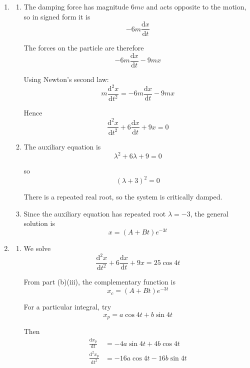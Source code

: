\documentclass[leqno]{article}
\begin{document}
\begin{enumerate}[
  label=\textbf{\arabic*.},
  leftmargin=*,
  topsep=0pt,
  partopsep=0pt,
  parsep=0pt
]
\begin{djsSolution}
\begin{enumerate}[label=\textbf{(\alph*)}]
\begin{enumerate}[label=(\roman*)]
    the amplitude is
    \[
    \sqrt{A^2+B^2}
    \]

    Here \(A=1\) and \(B=-2\), so
    \[
    \text{Amplitude}=\sqrt{1^2+(-2)^2}=\sqrt{5}\,\mathrm{m}
    \]
  \end{enumerate}

  \item
  \begin{enumerate}[label=(\roman*)]
    \item The damping force has magnitude \(6mv\) and acts opposite to the motion, so in signed form it is
    \[
    -6m\frac{\mathrm{d}x}{\mathrm{d}t}
    \]

    The forces on the particle are therefore
    \[
    -6m\frac{\mathrm{d}x}{\mathrm{d}t}-9mx
    \]

    Using Newton's second law:
    \[
    m\frac{\mathrm{d}^2x}{\mathrm{d}t^2}=-6m\frac{\mathrm{d}x}{\mathrm{d}t}-9mx
    \]

    Hence
    \[
    \frac{\mathrm{d}^2x}{\mathrm{d}t^2}+6\frac{\mathrm{d}x}{\mathrm{d}t}+9x=0
    \]

    \item The auxiliary equation is
    \[
    \lambda^2+6\lambda+9=0
    \]

    so
    \[
    (\lambda+3)^2=0
    \]

    There is a repeated real root, so the system is critically damped.

    \item Since the auxiliary equation has repeated root \(\lambda=-3\), the general solution is
    \[
    x=(A+Bt)e^{-3t}
    \]
  \end{enumerate}

  \item
  \begin{enumerate}[label=(\roman*)]
    \item We solve
    \[
    \frac{\mathrm{d}^2x}{\mathrm{d}t^2}+6\frac{\mathrm{d}x}{\mathrm{d}t}+9x=25\cos 4t
    \]

    From part (b)(iii), the complementary function is
    \[
    x_c=(A+Bt)e^{-3t}
    \]

    For a particular integral, try
    \[
    x_p=a\cos 4t+b\sin 4t
    \]

    Then
    \begin{align*}
    \frac{\mathrm{d}x_p}{\mathrm{d}t} &= -4a\sin 4t+4b\cos 4t \\
    \frac{\mathrm{d}^2x_p}{\mathrm{d}t^2} &= -16a\cos 4t-16b\sin 4t
    \end{align*}


\end{enumerate}
\end{enumerate}
\end{djsSolution}
\end{enumerate}
\end{document}
